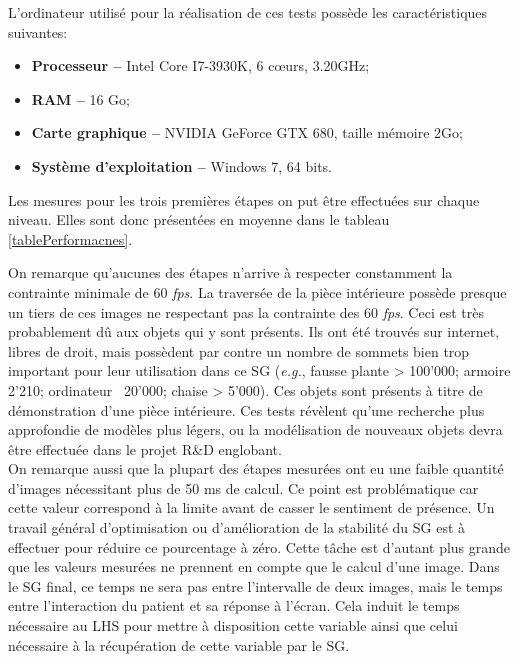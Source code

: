 	L'ordinateur utilisé pour la réalisation de ces tests possède les caractéristiques suivantes:
	\begin{itemize}
		\item \textbf{Processeur --} Intel Core I7-3930K, 6 cœurs, 3.20GHz;
		\item \textbf{RAM --} 16 Go;
		\item \textbf{Carte graphique --} NVIDIA GeForce GTX 680, taille mémoire 2Go;
		\item \textbf{Système d'exploitation --} Windows 7, 64 bits.
	\end{itemize}
	
	Les mesures pour les trois premières étapes on put être effectuées sur chaque niveau. Elles sont donc présentées  en moyenne dans le tableau \ref{tablePerformacnes}.
	
	On remarque qu'aucunes des étapes n'arrive à respecter constamment la contrainte minimale de 60 \textit{fps}. La traversée de la pièce intérieure possède presque un tiers de ces images ne respectant pas la contrainte des 60 \textit{fps}. Ceci est très probablement dû aux objets qui y sont présents. Ils ont été trouvés sur internet, libres de droit, mais possèdent par contre un nombre de sommets bien trop important pour leur utilisation dans ce SG (\textit{e.g.}, fausse plante > 100'000; armoire 2'210; ordinateur ~20'000; chaise > 5'000). Ces objets sont présents à titre de démonstration d'une pièce intérieure. Ces tests révèlent qu'une recherche plus approfondie de modèles plus légers, ou la modélisation de nouveaux objets devra être effectuée dans le projet R\&D englobant.
	\\
	
	On remarque aussi que la plupart des étapes mesurées ont eu une faible quantité d'images nécessitant plus de 50 ms de calcul. Ce point est problématique car cette valeur correspond à la limite avant de casser le sentiment de présence. Un travail général d'optimisation ou d'amélioration de la stabilité du SG est à effectuer pour réduire ce pourcentage à zéro. Cette tâche est d'autant plus grande que les valeurs mesurées ne prennent en compte que le calcul d'une image. Dans le SG final, ce temps ne sera pas entre l'intervalle de deux images, mais le temps entre l'interaction du patient et sa réponse à l'écran. Cela induit le temps nécessaire au LHS pour mettre à disposition cette variable ainsi que celui nécessaire à la récupération de cette variable par le SG.
	\\
	
